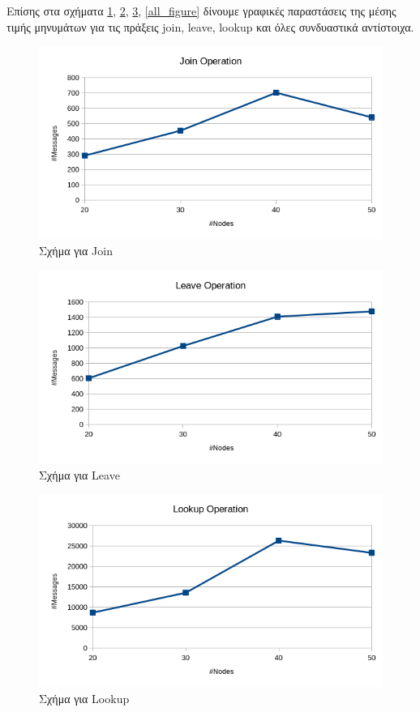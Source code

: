 \documentclass[12pt,a4paper]{article}
\begin{document}
Επίσης στα σχήματα \ref{join_figure}, \ref{leave_figure}, \ref{lookup_figure}, \ref{all_figure} δίνουμε γραφικές παραστάσεις της μέσης τιμής μηνυμάτων για τις πράξεις join, leave, lookup και όλες συνδυαστικά αντίστοιχα.

\begin{figure}[H]
	\centering
	\includegraphics[scale=0.55]{./images/join.png}
	\caption{Σχήμα για Join}
	\label{join_figure}
\end{figure}

\begin{figure}[H]
	\centering
	\includegraphics[scale=0.55]{./images/leave.png}
	\caption{Σχήμα για Leave}
	\label{leave_figure}
\end{figure}

\begin{figure}[H]
	\centering
	\includegraphics[scale=0.55]{./images/lookup.png}
	\caption{Σχήμα για Lookup}
	\label{lookup_figure}
\end{figure}
\end{document}
